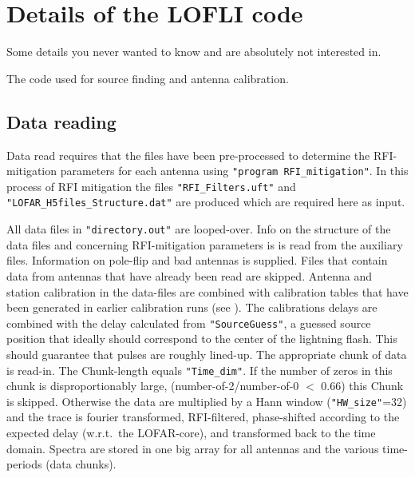 \section{Details of the LOFLI code}

Some details you never wanted to know and are absolutely not interested in.

The code used for source finding and antenna calibration.

\subsection{Data reading}

Data read requires that the files have been pre-processed to determine the RFI-mitigation parameters for each antenna using  \verb!"program RFI_mitigation"!. In this process of RFI mitigation the files \verb!"RFI_Filters.uft"! and \verb!"LOFAR_H5files_Structure.dat"! are produced which are required here as input.


All data files in \verb!"directory.out"! are looped-over.
Info on the structure of the data files and concerning RFI-mitigation parameters is is read from the auxiliary files. Information on pole-flip and bad antennas is supplied. Files that contain data from antennas that have already been read are skipped. Antenna and station calibration in the data-files are combined with calibration tables that have been generated in earlier calibration runs (see ). The calibrations delays are combined with the delay calculated from \verb!"SourceGuess"!, a guessed source position that ideally should correspond to the center of the lightning flash. This should guarantee that pulses are roughly lined-up. The appropriate chunk of data is read-in. The Chunk-length equals \verb!"Time_dim"!. If the number of zeros in this chunk is disproportionably large, (number-of-2/number-of-0 $<$ 0.66) this Chunk is skipped. Otherwise the data are multiplied by a Hann window (\verb!"HW_size"!=32) and the trace is fourier transformed, RFI-filtered, phase-shifted according to the expected delay (w.r.t.\ the LOFAR-core), and transformed back to the time domain. Spectra are stored in one big array for all antennas and the various time-periods (data chunks).

